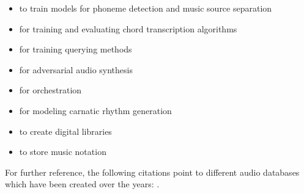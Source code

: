 \begin{itemize}
\item to train models for phoneme detection \parencite{DBLP:conf/ismir/ProutskovaRWC12} and music source separation \parencite{marius_miron_2017_1401923}
\item for training and evaluating chord transcription algorithms \parencite{DBLP:conf/ismir/EremenkoDBS18}
\item for training querying methods \parencite{mark_cartwright_2012_850060, DBLP:journals/corr/Brzezinski-SpiczakDLP13, DBLP:journals/corr/NagaviB14, DBLP:journals/corr/abs-1301-1894, icmc/bbp2372.1999.355} 


\item for adversarial audio synthesis \parencite{2018arXiv180204208D}
\item for orchestration \parencite{DBLP:conf/ismir/CrestelEHM17}
\item for modeling carnatic rhythm generation \parencite{carlos_guedes_2018_1422615}

\item to create digital libraries \parencite{DBLP:conf/ismir/Dunn00}
\item to store music notation \parencite{DBLP:conf/ismir/Good00}
\end{itemize}

For further reference, the following citations point to different audio databases which have been created over the years: \parencite{DBLP:conf/ismir/GotoHNO02, DBLP:conf/ismir/GotoHNO03, DBLP:conf/ismir/WustC04, DBLP:conf/ismir/MaxwellE08, DBLP:conf/ismir/Bertin-MahieuxEWL11, DBLP:conf/ismir/Karaosmanoglu12, Jaimovich:2012, Mital:2013, bbortz:2015, jjaimovich:2015,Nort2016,  DBLP:conf/ismir/DefferrardBVB17, DBLP:conf/ismir/VigliensoniF17, DBLP:conf/ismir/Meseguer-Brocal18, DBLP:conf/ismir/DonahueMM18, DBLP:conf/ismir/XiBPYB18, DBLP:conf/ismir/WilkinsSWP18}.